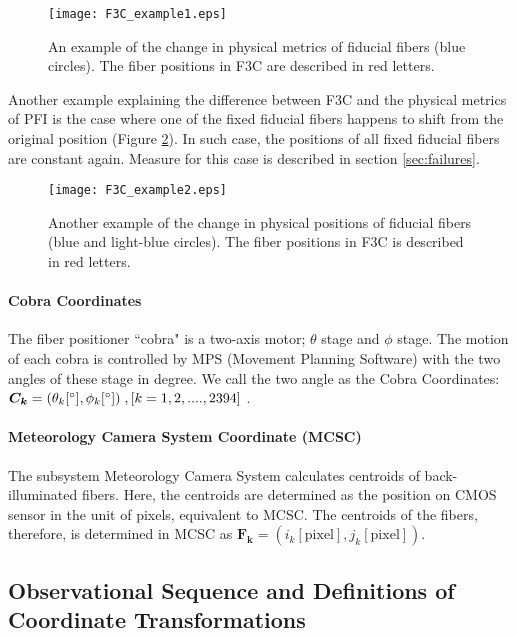 \begin{figure}[!ht]
\begin{center}
\texttt{[image: F3C\_example1.eps]}
\end{center}
\caption{An example of the change in physical metrics of fiducial fibers (blue circles).
The fiber positions in F3C are described in red letters.
}
\label{fig:F3Cex1}
\end{figure}

Another example explaining the difference between F3C and the physical metrics of PFI is the case where one of the fixed fiducial fibers happens to shift from the original position (Figure \ref{fig:F3Cex2}).
In such case, the positions of all fixed fiducial fibers are constant again.
Measure for this case is described in section \ref{sec:failures}.

\begin{figure}[!ht]
\begin{center}
\texttt{[image: F3C\_example2.eps]}
\end{center}
\caption{Another example of the change in physical positions of fiducial fibers (blue and light-blue circles).
The fiber positions in F3C is described in red letters.
}
\label{fig:F3Cex2}
\end{figure}

\paragraph{Cobra Coordinates}
The fiber positioner ``cobra" is a two-axis motor; $\theta$ stage and $\phi$ stage.
The motion of each cobra is controlled by MPS (Movement Planning Software) with the two angles of these stage in degree.
We call the two angle as the Cobra Coordinates: $\bm{C_k}=(\theta _k [ ^\circ ], \phi _k [ ^\circ ])\;, [k=1,2,....,2394]$ .

\paragraph{Meteorology Camera System Coordinate (MCSC)}
The subsystem Meteorology Camera System calculates centroids of back-illuminated fibers.
Here, the centroids are determined as the position on CMOS sensor in the unit of pixels, equivalent to MCSC.
The centroids of the fibers, therefore, is determined in MCSC as $\bm{F_k}=(i_k [ \mathrm{pixel} ], j_k [ \mathrm{pixel} ])$.

\subsection{Observational Sequence and Definitions of Coordinate Transformations}

